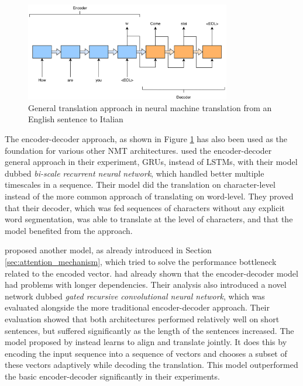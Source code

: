 \begin{figure}[ht]
    \centering
    \includegraphics[width=0.8\textwidth]{fig/related_work/encoder_decoder_en_it.png}
    \captionsetup{justification=centering}
    \caption{General translation approach in neural machine translation from an English sentence to Italian}
    \label{fig:machine-translation-encoder-decoder-simple}
\end{figure}

The encoder-decoder approach, as shown in Figure \ref{fig:machine-translation-encoder-decoder-simple} has also been used as the foundation for various other NMT architectures. \cite{chung2016character} used the encoder-decoder general approach in their experiment, GRUs, instead of LSTMs, with their model dubbed \emph{bi-scale recurrent neural network}, which handled better multiple timescales in a sequence. Their model did the translation on character-level instead of the more common approach of translating on word-level. They proved that their decoder, which was fed sequences of characters without any explicit word segmentation, was able to translate at the level of characters, and that the model benefited from the approach. 

\cite{bahdanau2014neural} proposed another model, as already introduced in Section \ref{sec:attention_mechanism}, which tried to solve the performance bottleneck related to the encoded vector. \cite{cho2014properties} had already shown that the encoder-decoder model had problems with longer dependencies. Their analysis also introduced a novel network dubbed \textit{gated recursive convolutional neural network}, which was evaluated alongside the more traditional encoder-decoder approach. Their evaluation showed that both architectures performed relatively well on short sentences, but suffered significantly as the length of the sentences increased. The model proposed by \cite{bahdanau2014neural} instead learns to align and translate jointly. It does this by encoding the input sequence into a sequence of vectors and chooses a subset of these vectors adaptively while decoding the translation. This model outperformed the basic encoder-decoder significantly in their experiments.

